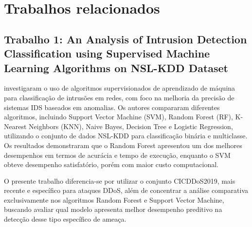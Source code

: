\documentclass[
    12pt,                %
    openright,           %
    oneside,             %
    a4paper,             %
    english,             %
    brazil               %
]{abntex2}
\begin{document}





\section{Trabalhos relacionados}
\label{sec:trabalhos_relacionados}

\subsection{Trabalho 1: An Analysis of Intrusion Detection Classification using Supervised Machine Learning Algorithms on NSL-KDD Dataset}

 investigaram o uso de algoritmos supervisionados de aprendizado de máquina para classificação de intrusões em redes, com foco na melhoria da precisão de sistemas IDS baseados em anomalias. Os autores compararam diferentes algoritmos, incluindo Support Vector Machine (SVM), Random Forest (RF), K-Nearest Neighbors (KNN), Naive Bayes, Decision Tree e Logistic Regression, utilizando o conjunto de dados NSL-KDD para classificação binária e multiclasse. Os resultados demonstraram que o Random Forest apresentou um dos melhores desempenhos em termos de acurácia e tempo de execução, enquanto o SVM obteve desempenho satisfatório, porém com maior custo computacional.

O presente trabalho diferencia-se por utilizar o conjunto CICDDoS2019, mais recente e específico para ataques DDoS, além de concentrar a análise comparativa exclusivamente nos algoritmos Random Forest e Support Vector Machine, buscando avaliar qual modelo apresenta melhor desempenho preditivo na detecção desse tipo específico de ameaça.
\end{document}
